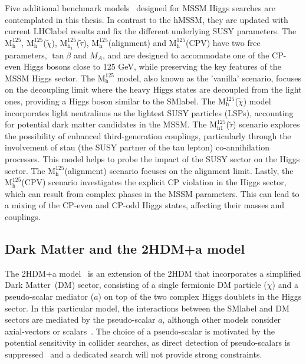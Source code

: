Five additional benchmark models~\cite{Bagnaschi_2019} designed for MSSM Higgs searches are contemplated in this thesis. In contrast to the hMSSM, they are updated with current \acrshort{LHClabel} results and fix the different underlying SUSY parameters. The $\text{M}^{125}_\text{h}$, $\text{M}^{125}_\text{h}$($\tilde{\chi}$), $\text{M}^{125}_{\text{h}_1}$($\tilde{\tau}$), $\text{M}^{125}_\text{h}$(alignment) and $\text{M}^{125}_\text{h}$(CPV) have two free parameters, $\tan\beta$ and $M_A$, and are designed to accommodate one of the CP-even Higgs bosons close to 125 GeV, while preserving the key features of the MSSM Higgs sector. The $\text{M}^{125}_\text{h}$ model, also known as the 'vanilla' scenario, focuses on the decoupling limit where the heavy Higgs states are decoupled from the light ones, providing a Higgs boson similar to the \acrshort{SMlabel}. The $\text{M}^{125}_\text{h}$($\tilde{\chi}$) model incorporates light neutralinos as the lightest SUSY particles (LSPs), accounting for potential dark matter candidates in the MSSM. The $\text{M}^{125}_{\text{h}1}$($\tilde{\tau}$) scenario explores the possibility of enhanced third-generation couplings, particularly through the involvement of stau (the SUSY partner of the tau lepton) co-annihilation processes. This model helps to probe the impact of the SUSY sector on the Higgs sector. The $\text{M}^{125}_\text{h}$(alignment) scenario focuses on the alignment limit. Lastly, the $\text{M}^{125}_\text{h}$(CPV) scenario investigates the explicit CP violation in the Higgs sector, which can result from complex phases in the MSSM parameters. This can lead to a mixing of the CP-even and CP-odd Higgs states, affecting their masses and couplings.

\subsection{Dark Matter and the 2HDM+a model}

The 2HDM+a model~\cite{Bauer_2017,10.48550/arxiv.1810.09420} is an extension of the 2HDM that incorporates a simplified Dark Matter~(DM) sector, consisting of a single fermionic DM particle ($\chi$) and a pseudo-scalar mediator ($a$) on top of the two complex Higgs doublets in the Higgs sector. In this particular model, the interactions between the \acrshort{SMlabel} and DM sectors are mediated by the pseudo-scalar $a$, although other models consider axial-vectors or scalars~\cite{Abercrombie_2020,10.48550/arxiv.1603.04156,10.48550/arxiv.1703.05703}. The choice of a pseudo-scalar is motivated by the potential sensitivity in collider searches, as direct detection of pseudo-scalars is suppressed~\cite{Abe_2019} and a dedicated search will not provide strong constraints.\\

